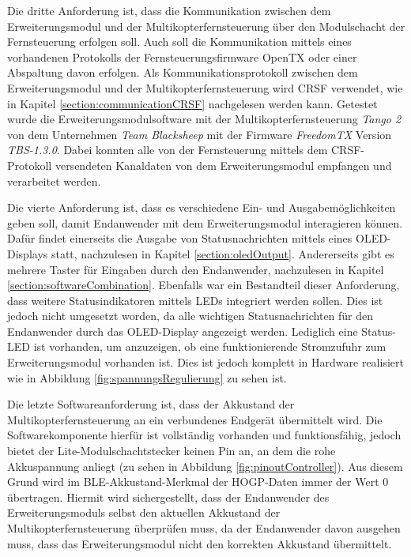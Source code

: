 Die dritte Anforderung ist, dass die Kommunikation zwischen dem Erweiterungsmodul und der Multikopterfernsteuerung über den Modulschacht der Fernsteuerung erfolgen soll. Auch soll die Kommunikation mittels eines vorhandenen Protokolls der Fernsteuerungsfirmware OpenTX oder einer Abspaltung davon erfolgen. Als Kommunikationsprotokoll zwischen dem Erweiterungsmodul und der Multikopterfernsteuerung wird CRSF verwendet, wie in Kapitel \ref{section:communicationCRSF} nachgelesen werden kann. Getestet wurde die Erweiterungsmodulsoftware mit der Multikopterfernsteuerung \textit{Tango 2} von dem Unternehmen \textit{Team Blacksheep} mit der Firmware \textit{FreedomTX} Version \textit{TBS-1.3.0}. Dabei konnten alle von der Fernsteuerung mittels dem CRSF-Protokoll versendeten Kanaldaten von dem Erweiterungsmodul empfangen und verarbeitet werden.

Die vierte Anforderung ist, dass es verschiedene Ein- und Ausgabemöglichkeiten geben soll, damit Endanwender mit dem Erweiterungsmodul interagieren können. Dafür findet einerseits die Ausgabe von Statusnachrichten mittels eines \acs{OLED}-Displays statt, nachzulesen in Kapitel \ref{section:oledOutput}. Andererseits gibt es mehrere Taster für Eingaben durch den Endanwender, nachzulesen in Kapitel \ref{section:softwareCombination}. Ebenfalls war ein Bestandteil dieser Anforderung, dass weitere Statusindikatoren mittels \acp{LED} integriert werden sollen. Dies ist jedoch nicht umgesetzt worden, da alle wichtigen Statusnachrichten für den Endanwender durch das \acs{OLED}-Display angezeigt werden. Lediglich eine Status-\ac{LED} ist vorhanden, um anzuzeigen, ob eine funktionierende Stromzufuhr zum Erweiterungsmodul vorhanden ist. Dies ist jedoch komplett in Hardware realisiert wie in Abbildung \ref{fig:spannungsRegulierung} zu sehen ist.

Die letzte Softwareanforderung ist, dass der Akkustand der Multikopterfernsteuerung an ein verbundenes Endgerät übermittelt wird. Die Softwarekomponente hierfür ist vollständig vorhanden und funktionsfähig, jedoch bietet der Lite-Modulschachtstecker keinen Pin an, an dem die rohe Akkuspannung anliegt (zu sehen in Abbildung \ref{fig:pinoutController}). Aus diesem Grund wird im \ac{BLE}-Akkustand-Merkmal der \ac{HOGP}-Daten immer der Wert 0 übertragen. Hiermit wird sichergestellt, dass der Endanwender des Erweiterungsmoduls selbst den aktuellen Akkustand der Multikopterfernsteuerung überprüfen muss, da der Endanwender davon ausgehen muss, dass das Erweiterungsmodul nicht den korrekten Akkustand übermittelt.


